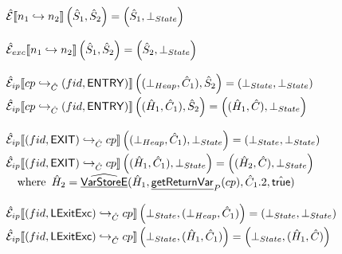 \documentclass{article}
\newcommand{\SF}[1]{\mbox{\textsf{#1}}}
\newcommand{\cfgnext}{\hookrightarrow}
\newcommand{\wherec}[1]{{\rm where}\begin{array}[t]{l}#1\end{array}}
\newcommand{\aE}{\hat{\mathcal{E}}}
\newcommand{\lbr}{\llbracket}
\newcommand{\rbr}{\rrbracket}
\newcommand{\hf}[1]{\underline{\sf #1}}
\newcommand{\ahf}[1]{\widehat{\underline{\sf #1}}}
\newcommand{\atrue}{\hat{\SF{true}}}
\begin{document}
\[
\begin{array}{l}
\aE \lbr n_1 \cfgnext n_2 \rbr \left(\hat{S}_1,\hat{S}_2\right) =
  \left(\hat{S}_1,\bot_{State}\right)
\\\\

\aE_{exc} \lbr n_1 \cfgnext n_2 \rbr \left(\hat{S}_1,\hat{S}_2\right) =
  \left(\hat{S}_2,\bot_{State}\right)
\\\\

\aE_{ip} \lbr cp \cfgnext_{\hat{C}} (fid,\SF{ENTRY}) \rbr \left((\bot_{Heap},\hat{C}_1),\hat{S}_2\right) =
  \left(\bot_{State},\bot_{State}\right)
\vspace{1mm}\\

\aE_{ip} \lbr cp \cfgnext_{\hat{C}} (fid,\SF{ENTRY}) \rbr \left((\hat{H}_1,\hat{C}_1),\hat{S}_2\right) =
  \left((\hat{H}_1,\hat{C}),\bot_{State}\right)
\\\\

\aE_{ip} \lbr (fid,\SF{EXIT}) \cfgnext_{\hat{C}} cp \rbr \left((\bot_{Heap},\hat{C}_1),\bot_{State}\right) =
  \left(\bot_{State},\bot_{State}\right)
\vspace{1mm}\\

\aE_{ip} \lbr (fid,\SF{EXIT}) \cfgnext_{\hat{C}} cp \rbr \left((\hat{H}_1,\hat{C}_1),\bot_{State}\right) =
  \left((\hat{H}_2,\hat{C}),\bot_{State}\right) \\
  \quad\wherec{
    \hat{H}_2 = \ahf{VarStoreE}(\hat{H}_1, \hf{getReturnVar}_P(cp), \hat{C}_1.2, \atrue)
  }
\\\\

\aE_{ip} \lbr (fid,\SF{LExitExc}) \cfgnext_{\hat{C}} cp \rbr \left(\bot_{State},(\bot_{Heap},\hat{C}_1)\right) =
  \left(\bot_{State},\bot_{State}\right)
\vspace{1mm}\\

\aE_{ip} \lbr (fid,\SF{LExitExc}) \cfgnext_{\hat{C}} cp \rbr \left(\bot_{State},(\hat{H}_1,\hat{C}_1)\right) =
  \left(\bot_{State},(\hat{H}_1,\hat{C})\right)
\\\\

\end{array}
\]
\end{document}

